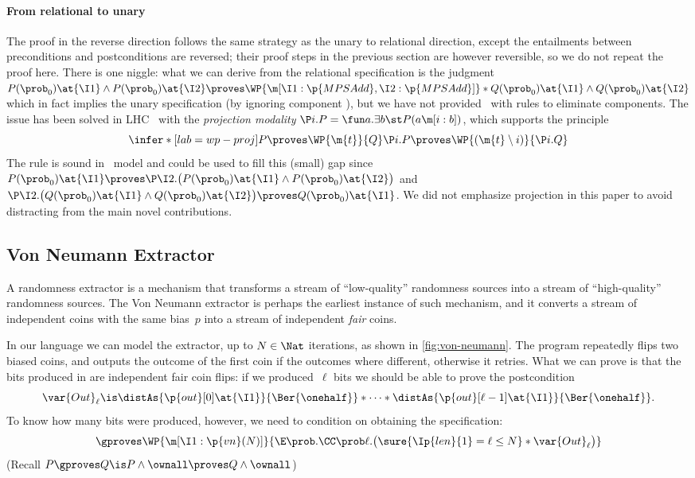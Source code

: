 \paragraph{From relational to unary}
The proof in the reverse direction follows the same strategy as the unary to relational direction, except the entailments between preconditions and postconditions are reversed; their proof steps in the previous section are however reversible, so we do not repeat the proof here.
There is one niggle:
what we can derive from the relational specification is the judgment
$
  P(\prob_0)\at{\I1} \land P(\prob_0)\at{\I2}
  \proves
  \WP {\m[\I1: \p{MPSAdd}, \I2: \p{MPSAdd}]}*{
    Q(\prob_0)\at{\I1} \land Q(\prob_0)\at{\I2}
  }
$
which in fact implies the unary specification (by ignoring component ),
but we have not provided \thelogic\ with rules to eliminate components.
The issue has been solved in LHC~\cite{d2022proving} with
the \emph{projection modality}
$ \P i. P = \fun a. \exists b\st P(a\m[i: b]) $,
which supports the principle
\[
  \infer*[lab=wp-proj]{
    P \proves \WP {\m{t}} {Q}
  }{
    \P i. P \proves \WP {(\m{t}\setminus i)} {\P i.Q}
  }
\]
The rule is sound in \thelogic\ model and could be used to fill this (small) gap
since
$
  P(\prob_0)\at{\I1}
  \proves
  \P\I2.\bigl(P(\prob_0)\at{\I1} \land P(\prob_0)\at{\I2}\bigr)
$ and
$
  \P\I2.\bigl(Q(\prob_0)\at{\I1} \land Q(\prob_0)\at{\I2}\bigr)
  \proves
  Q(\prob_0)\at{\I1}
$.
We did not emphasize projection in this paper to avoid distracting from the main novel contributions.
 

\subsection{Von Neumann Extractor}
\label{sec:appendix:ex:von-neumann}

  A randomness extractor is a mechanism that transforms a stream of
``low-quality'' randomness sources into a stream of ``high-quality''
randomness sources.
The Von Neumann extractor is perhaps the earliest instance of such mechanism,
and it converts a stream of independent coins with the same bias~$p$
into a stream of independent \emph{fair} coins.

In our language we can model the extractor, up to $N \in \Nat$ iterations,
as shown in \cref{fig:von-neumann}.
The program repeatedly flips two biased coins, and outputs the outcome of the first coin if the outcomes where different, otherwise it retries.
What we can prove is that the bits produced in  are independent fair coin flips: if we produced~$\ell$ bits we should be able to prove the postcondition
\[
  \var{Out}_\ell \is
  \distAs{\p{out}[0]\at{\I1}}{\Ber{\onehalf}} *
  \dots *
  \distAs{\p{out}[\ell-1]\at{\I1}}{\Ber{\onehalf}}.
\]
To know how many bits were produced, however,
we need to condition on 
obtaining the specification:
\[
  \gproves \WP {\m[\I1: \p{vn}(N)]} {
    \E \prob. \CC \prob \ell. \bigl(
      \sure{\Ip{len}{1} = \ell \leq N} *
      \var{Out}_\ell
    \bigr)
  }
\]
(Recall $ P \gproves Q \is P \land \ownall \proves Q \land \ownall $)



